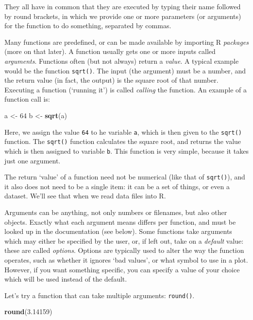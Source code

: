 \documentclass[
]{book}
\newenvironment{Shaded}{\begin{snugshade}}{\end{snugshade}}
\newcommand{\DecValTok}[1]{\textcolor[rgb]{0.00,0.00,0.81}{#1}}
\newcommand{\FloatTok}[1]{\textcolor[rgb]{0.00,0.00,0.81}{#1}}
\newcommand{\KeywordTok}[1]{\textcolor[rgb]{0.13,0.29,0.53}{\textbf{#1}}}
\newcommand{\NormalTok}[1]{#1}
\newcommand{\StringTok}[1]{\textcolor[rgb]{0.31,0.60,0.02}{#1}}
\begin{document}
They all have in common that they are executed by typing their name followed by round brackets, in which we provide one or more parameters (or arguments) for the function to do something, separated by commas.

Many functions are predefined, or can be
made available by importing R \emph{packages} (more on that later). A function
usually gets one or more inputs called \emph{arguments}. Functions often (but not
always) return a \emph{value}. A typical example would be the function \texttt{sqrt()}. The
input (the argument) must be a number, and the return value (in fact, the
output) is the square root of that number. Executing a function (`running it')
is called \emph{calling} the function. An example of a function call is:

\begin{Shaded}
\begin{Highlighting}[]
\NormalTok{a <-}\StringTok{ }\DecValTok{64}
\NormalTok{b <-}\StringTok{ }\KeywordTok{sqrt}\NormalTok{(a)}
\end{Highlighting}
\end{Shaded}

Here, we assign the value \texttt{64} to he variable \texttt{a}, which is then given to the \texttt{sqrt()} function. The \texttt{sqrt()} function
calculates the square root, and returns the value which is then assigned to
variable \texttt{b}. This function is very simple, because it takes just one argument.

The return `value' of a function need not be numerical (like that of \texttt{sqrt()}),
and it also does not need to be a single item: it can be a set of things, or
even a dataset. We'll see that when we read data files into R.

Arguments can be anything, not only numbers or filenames, but also other
objects. Exactly what each argument means differs per function, and must be
looked up in the documentation (see below). Some functions take arguments which
may either be specified by the user, or, if left out, take on a \emph{default} value:
these are called \emph{options}. Options are typically used to alter the way the
function operates, such as whether it ignores `bad values', or what symbol to
use in a plot. However, if you want something specific, you can specify a value
of your choice which will be used instead of the default.

Let's try a function that can take multiple arguments: \texttt{round()}.

\begin{Shaded}
\begin{Highlighting}[]
\KeywordTok{round}\NormalTok{(}\FloatTok{3.14159}\NormalTok{)}
\end{Highlighting}
\end{Shaded}
\end{document}
